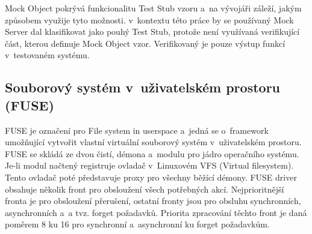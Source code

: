 Mock Object pokrývá funkcionalitu Test Stub vzoru a na vývojáři záleží, jakým způsobem využije tyto možnosti. v kontextu této práce by se používaný Mock Server dal
klasifikovat jako pouhý Test Stub, protože není využívaná verifikující část, kterou definuje Mock Object vzor. \cite[524--525]{UnitPatternsTest} Verifikovaný je pouze
výstup funkcí v testovaném systému.

\subsection{Souborový systém v uživatelském prostoru (FUSE)}
\label{sec:fuse}

FUSE je označení pro File system in userspace a jedná se o framework umožňující vytvořit vlastní virtuální souborový systém v uživatelském prostoru. FUSE se skládá
ze dvou čistí, démona a modulu pro jádro operačního systému. Je-li modul načtený registruje ovladač v Linuxovém VFS (Virtual filesystem). Tento ovladač poté
představuje proxy pro všechny běžící démony. FUSE driver obsahuje několik front pro obsloužení všech potřebných akcí. Nejprioritnější fronta je pro obsloužení
přerušení, ostatní fronty jsou pro obsluhu synchronních, asynchronních a a tvz. forget požadavků. Priorita zpracování těchto front je daná poměrem 8 ku 16 pro 
synchronní a asynchronní ku forget požadavkům. \cite{FuseOrNotToFuse}

